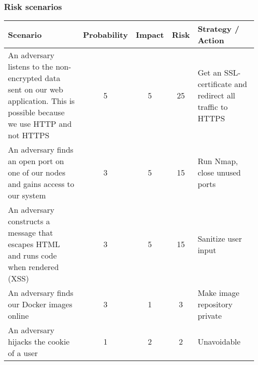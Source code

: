 \subsubsection{Risk scenarios}

\begin{center}
\begin{tabular}{ |p{3.5cm}|c|c|c|p{2.5cm}| } 
 \hline
 Scenario & Probability & Impact & Risk & Strategy / Action\\ [0.5ex] 
 \hline
 An adversary listens to the non-encrypted data sent on our web application. This is possible because we use HTTP and not HTTPS
 & 5 & 5 & 25 & Get an SSL-certificate and redirect all traffic to HTTPS\\
\hline
 An adversary finds an open port on one of our nodes and gains access to our system & 3 & 5 & 15 & Run Nmap, close unused ports\\
 \hline 
 An adversary constructs a message that escapes HTML and runs code when rendered (XSS) & 3 & 5 & 15 & Sanitize user input\\
 \hline
  An adversary finds our Docker images online & 3 & 1 & 3 & Make image repository private\\ 
 \hline
 An adversary hijacks the cookie of a user & 1 & 2 & 2 & Unavoidable\\ 
 \hline
\end{tabular}
\end{center}

